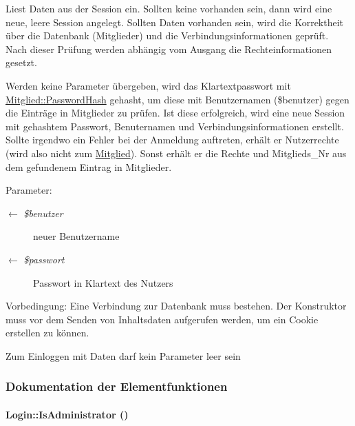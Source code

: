 Liest Daten aus der Session ein. Sollten keine vorhanden sein, dann wird eine neue, leere Session angelegt. Sollten Daten vorhanden sein, wird die Korrektheit über die Datenbank (Mitglieder) und die Verbindungsinformationen geprüft. Nach dieser Prüfung werden abhängig vom Ausgang die Rechteinformationen gesetzt.\par
 Werden keine Parameter übergeben, wird das Klartextpasswort mit \hyperlink{classMitglied_9b13db80866c22bf992e73f2eb75e369}{Mitglied::Password\-Hash} gehasht, um diese mit Benutzernamen (\$benutzer) gegen die Einträge in Mitglieder zu prüfen. Ist diese erfolgreich, wird eine neue Session mit gehashtem Passwort, Benuternamen und Verbindungsinformationen erstellt. Sollte irgendwo ein Fehler bei der Anmeldung auftreten, erhält er Nutzerrechte (wird also nicht zum \hyperlink{classMitglied}{Mitglied}). Sonst erhält er die Rechte und Mitglieds\_\-Nr aus dem gefundenem Eintrag in Mitglieder. \begin{Desc}
\item[Parameter:]
\begin{description}
\item[\mbox{$\leftarrow$} {\em \$benutzer}]neuer Benutzername \item[\mbox{$\leftarrow$} {\em \$passwort}]Passwort in Klartext des Nutzers \end{description}
\end{Desc}
\begin{Desc}
\item[Vorbedingung:]Eine Verbindung zur Datenbank muss bestehen. Der Konstruktor muss vor dem Senden von Inhaltsdaten aufgerufen werden, um ein Cookie erstellen zu können.\par
 Zum Einloggen mit Daten darf kein Parameter leer sein\end{Desc}


\subsubsection{Dokumentation der Elementfunktionen}
\hypertarget{classLogin_6c120224aa6719f58c6ccd08acc28758}{
\paragraph[IsAdministrator]{\setlength{\rightskip}{0pt plus 5cm}Login::Is\-Administrator ()}\hfill}
\label{classLogin_6c120224aa6719f58c6ccd08acc28758}


